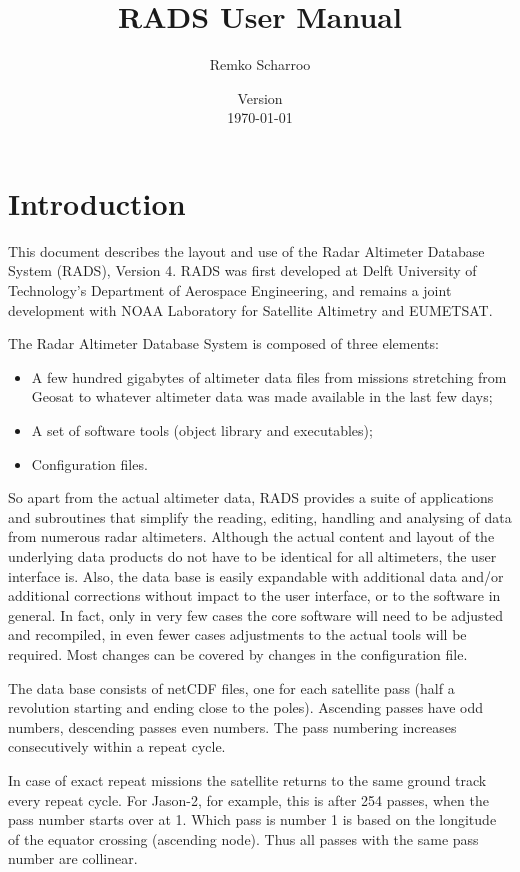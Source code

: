 \documentclass[a4paper,11pt,openany,natbib,nomargin]{thesis}
\title{RADS User Manual}
\author{Remko Scharroo}
\date{Version \vernum\\\today}
\begin{document}
\maketitle
\tableofcontents

\chapter{Introduction}

\label{ch:intro}

This document describes the layout and use of the Radar Altimeter Database System (RADS), Version 4. RADS was first developed at Delft University of Technology's Department of Aerospace Engineering, and remains a joint development with NOAA Laboratory for Satellite Altimetry and EUMETSAT.

The Radar Altimeter Database System is composed of three elements:
\begin{itemize}
\item A few hundred gigabytes of altimeter data files from missions stretching from Geosat to whatever altimeter data was made available in the last few days;
\item A set of software tools (object library and executables);
\item Configuration files.
\end{itemize}

So apart from the actual altimeter data, RADS provides a suite of applications and subroutines that simplify the reading, editing, handling and analysing of data from numerous radar altimeters. Although the actual content and layout of the underlying data products do not have to be identical for all altimeters, the user interface is. Also, the data base is easily expandable with additional data and/or additional corrections without impact to the user interface, or to the software in general. In fact, only in very few cases the core software will need to be adjusted and recompiled, in even fewer cases adjustments to the actual tools will be required. Most changes can be covered by changes in the configuration file.

The data base consists of netCDF files, one for each satellite pass (half a revolution starting and ending close to the poles). Ascending passes have odd numbers, descending passes even numbers. The pass numbering increases consecutively within a repeat cycle.

In case of exact repeat missions the satellite returns to the same ground track every repeat cycle. For Jason-2, for example, this is after 254 passes, when the pass number starts over at 1. Which pass is number 1 is based on the longitude of the equator crossing (ascending node). Thus all passes with the same pass number are collinear.
\end{document}
